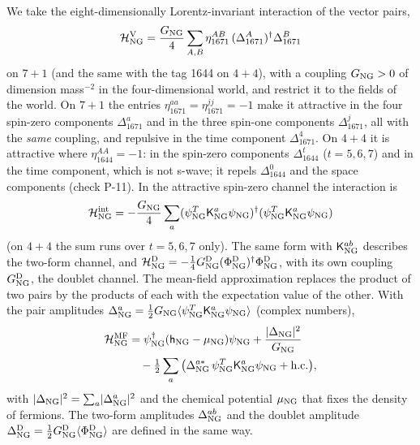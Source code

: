 We take the eight-dimensionally Lorentz-invariant interaction of the vector pairs,
\begin{equation}
\mathcal H^{\rm V}_{\rm NG}=\frac{G_{\rm NG}}4\sum_{A,B}\eta^{AB}_{1671}\,(\Delta^A_{1671})^\dagger\Delta^B_{1671}
\label{eq:hv}
\end{equation}
on $7+1$ (and the same with the tag 1644 on $4+4$), with a coupling $G_{\rm NG}>0$ of dimension
mass$^{-2}$ in the four-dimensional world, and restrict it to the fields of the world. On $7+1$ the
entries $\eta^{aa}_{1671}=\eta^{jj}_{1671}=-1$ make it attractive in the four spin-zero components
$\Delta^a_{1671}$ and in the three spin-one components $\Delta^j_{1671}$, all with the \emph{same}
coupling, and repulsive in the time component $\Delta^4_{1671}$. On $4+4$ it is attractive where
$\eta^{AA}_{1644}=-1$: in the spin-zero components $\Delta^t_{1644}$ ($t=5,6,7$) and in the time
component, which is not s-wave; it repels $\Delta^0_{1644}$ and the space components (check P-11). In
the attractive spin-zero channel the interaction is
\begin{equation}
\mathcal H^{\rm int}_{\rm NG}=-\frac{G_{\rm NG}}4\sum_a(\psi^T_{\rm NG}\mathsf K^a_{\rm NG}\psi_{\rm NG})^\dagger
(\psi^T_{\rm NG}\mathsf K^a_{\rm NG}\psi_{\rm NG})
\label{eq:hint}
\end{equation}
(on $4+4$ the sum runs over $t=5,6,7$ only). The same form with $\mathsf K^{ab}_{\rm NG}$ describes the
two-form channel, and $\mathcal H^{\rm D}_{\rm NG}=-\tfrac14G^{\rm D}_{\rm NG}(\Phi^{\rm D}_{\rm NG})^\dagger
\Phi^{\rm D}_{\rm NG}$, with its own coupling $G^{\rm D}_{\rm NG}$, the doublet channel. The mean-field
approximation replaces the product of two pairs by the products of each with the expectation value of
the other. With the pair amplitudes $\Delta^a_{\rm NG}=\tfrac12G_{\rm NG}\langle\psi^T_{\rm NG}
\mathsf K^a_{\rm NG}\psi_{\rm NG}\rangle$ (complex numbers),
\begin{align}
\mathcal H^{\rm MF}_{\rm NG}&=\psi^\dagger_{\rm NG}(\mathsf h_{\rm NG}-\mu_{\rm NG})\psi_{\rm NG}+\frac{\lvert\Delta_{\rm NG}\rvert^2}{G_{\rm NG}}\nonumber\\
&\quad-\tfrac12\sum_a\big(\Delta^{a*}_{\rm NG}\,\psi^T_{\rm NG}\mathsf K^a_{\rm NG}\psi_{\rm NG}+{\rm h.c.}\big),
\label{eq:hmf}
\end{align}
with $\lvert\Delta_{\rm NG}\rvert^2=\sum_a\lvert\Delta^a_{\rm NG}\rvert^2$ and the chemical potential
$\mu_{\rm NG}$ that fixes the density of fermions. The two-form amplitudes $\Delta^{ab}_{\rm NG}$ and the
doublet amplitude $\Delta^{\rm D}_{\rm NG}=\tfrac12G^{\rm D}_{\rm NG}\langle\Phi^{\rm D}_{\rm NG}\rangle$ are
defined in the same way.


